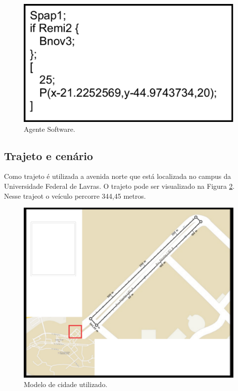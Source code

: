 \begin{figure}[htbp]
	\centering
	\includegraphics[scale=0.3]{metodologia/figuras/exemploCodigoAgente.pdf}
	\caption{Agente Software.}
	\label{fig:exemploCodigoAgente}
\end{figure}

\subsection{Trajeto e cenário}

Como trajeto é utilizada a avenida norte que está localizada no campus da Universidade Federal de Lavras. O trajeto pode ser visualizado na Figura \ref{fig:trajetoExperimento}. Nesse trajeot o veículo percorre 344,45 metros. 

\begin{figure}[htbp]
	\centering
	\includegraphics[scale=0.4]{metodologia/figuras/trajetoExperimento.pdf}
	\caption{Modelo de cidade utilizado.}
	\label{fig:trajetoExperimento}
\end{figure}

